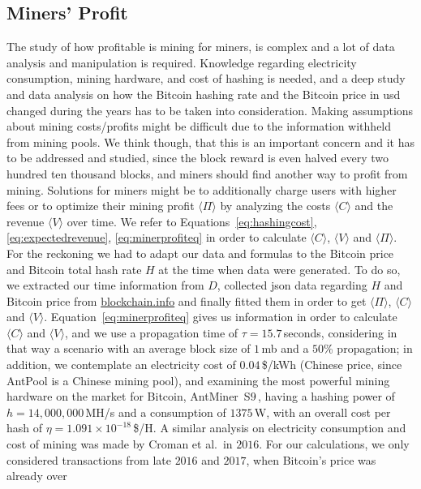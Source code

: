 \documentclass[USenglish]{uit-thesis}
\begin{document}
\subsection{Miners' Profit}
\label{sec:minersprofit}
The study of how profitable is mining for miners,
is complex and a lot of
data analysis and manipulation is required. Knowledge
regarding electricity consumption, mining hardware, and
cost of hashing is needed, and a deep study and data analysis
on how the Bitcoin hashing rate and the Bitcoin price in \gls{usd}
changed during the years has to be taken into consideration.
Making assumptions about mining costs/profits might be
difficult due to the information withheld from mining pools.
We think though, that this is an important concern and it has
to be addressed and studied, since the block reward is even
halved every two hundred ten thousand
blocks, and miners should find another
way to profit from mining. Solutions for miners might be to
additionally charge users with higher fees or to optimize
their mining profit $\langle \Pi \rangle$ by analyzing
the costs $\langle C \rangle$ and the revenue $\langle V \rangle$
over time. We refer to Equations~\ref{eq:hashingcost},
\ref{eq:expectedrevenue},
\ref{eq:minerprofiteq} in order to calculate
$\langle C \rangle$, $\langle V \rangle$ and $\langle \Pi \rangle$.
For the reckoning
we had to adapt our data and formulas to the
Bitcoin price and Bitcoin total hash rate $H$ at the time
when data were generated. To do so, we extracted our
time information from $D$, collected \gls{json} data
regarding $H$ and Bitcoin price from \url{blockchain.info}
and finally fitted them in order to get $\langle \Pi \rangle$,
$\langle C \rangle$ and $\langle V \rangle$.
Equation~\ref{eq:minerprofiteq} gives us information
in order to calculate $\langle C \rangle$ and
$\langle V \rangle$, and we use
a propagation time of $\tau = 15.7$\,seconds,
considering in that way a scenario with
an average block size of $1$\,\gls{mb} and
a $50$\% propagation; in addition, we contemplate
an electricity cost of $0.04$\,\$/kWh (Chinese price, since
AntPool is a Chinese mining pool), and
examining the most powerful
mining hardware on the market for Bitcoin,
AntMiner~S$9$\,\cite{antminerS9}, having a hashing power
of $h = 14,000,000$\,MH/s and a consumption
of $1375$\,W, with an overall cost per hash of
$\eta = 1.091 \times 10^{-18}$\,\$/H.
A similar analysis on electricity consumption and
cost of mining was made by Croman et al.\,\cite{croman2016}
in $2016$.
For our calculations, we only considered transactions from
late $2016$ and $2017$, when Bitcoin's price was already over
\end{document}
